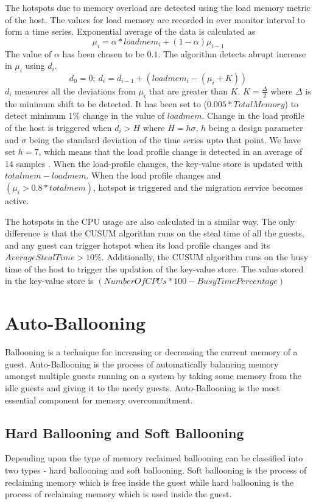 The hotspots due to memory overload are detected using the load memory metric of the host. The values for load memory are recorded in ever monitor interval to form a time series. Exponential average of the data is calculated as
$$ \mu_i = \alpha * loadmem_i + (1-\alpha)\mu_{i-1}$$
The value of $\alpha$ has been chosen to be $0.1$. The algorithm detects abrupt increase in  $\mu_i$ using $d_i$.
$$d_0 = 0;\ d_i = d_{i-1}+(loadmem_i - (\mu_i+K))$$
$d_i$ measures all the deviations from $\mu_i$ that are greater than $K$. $K=\frac{\Delta}{2}$ where $\Delta$ is the minimum shift to
be detected. It has been set to ($0.005*TotalMemory$) to detect minimum 1\% change in the value of $loadmem$. Change in the load profile of the host is triggered when $d_i > H$ where $H = h\sigma$, $h$ being a design parameter and $\sigma$ being the standard deviation of the time series upto that point. We have set $h=7$, which means that the load profile change is detected in an average of 14 samples \cite{andreolini2009dynamic}.
When the load-profile changes, the key-value store is updated with $totalmem - loadmem$. When the load profile changes and $(\mu_i > 0.8 * totalmem)$, hotspot is triggered and the migration service becomes active.

The hotspots in the CPU usage are also calculated in a similar way. The only difference is that the CUSUM algorithm runs on the steal time of all the guests, and any guest can trigger hotspot when its load profile changes and its $Average Steal Time > 10\%$. Additionally, the CUSUM algorithm runs on the busy time of the host to trigger the updation of the key-value store. The value stored in the key-value store is $(Number Of CPUs*100-BusyTimePercentage)$

\section{Auto-Ballooning}
Ballooning is a technique for increasing or decreasing the current memory of a guest. Auto-Ballooning is the process of automatically balancing memory amongst multiple guests running on a system by taking some memory from the idle guests and giving it to the needy guests. Auto-Ballooning is the most essential component for memory overcommitment.

\subsection{Hard Ballooning and Soft Ballooning} \label{sec:bal}
Depending upon the type of memory reclaimed ballooning can be classified into two types - hard ballooning and soft ballooning. Soft ballooning is the process of reclaiming memory which is free inside the guest while hard ballooning is the process of reclaiming memory which is used inside the guest.

